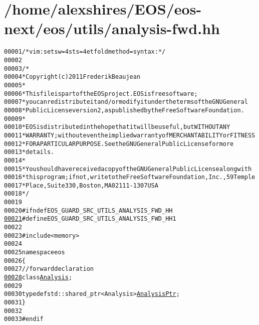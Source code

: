 \hypertarget{analysis-fwd_8hh_source}{
\section{/home/alexshires/EOS/eos-\/next/eos/utils/analysis-\/fwd.hh}
}


\begin{footnotesize}\begin{alltt}
00001 \textcolor{comment}{/* vim: set sw=4 sts=4 et foldmethod=syntax : */}
00002 
00003 \textcolor{comment}{/*}
00004 \textcolor{comment}{ * Copyright (c) 2011 Frederik Beaujean}
00005 \textcolor{comment}{ *}
00006 \textcolor{comment}{ * This file is part of the EOS project. EOS is free software;}
00007 \textcolor{comment}{ * you can redistribute it and/or modify it under the terms of the GNU General}
00008 \textcolor{comment}{ * Public License version 2, as published by the Free Software Foundation.}
00009 \textcolor{comment}{ *}
00010 \textcolor{comment}{ * EOS is distributed in the hope that it will be useful, but WITHOUT ANY}
00011 \textcolor{comment}{ * WARRANTY; without even the implied warranty of MERCHANTABILITY or FITNESS}
00012 \textcolor{comment}{ * FOR A PARTICULAR PURPOSE.  See the GNU General Public License for more}
00013 \textcolor{comment}{ * details.}
00014 \textcolor{comment}{ *}
00015 \textcolor{comment}{ * You should have received a copy of the GNU General Public License along with}
00016 \textcolor{comment}{ * this program; if not, write to the Free Software Foundation, Inc., 59 Temple}
00017 \textcolor{comment}{ * Place, Suite 330, Boston, MA  02111-1307  USA}
00018 \textcolor{comment}{ */}
00019 
00020 \textcolor{preprocessor}{#ifndef EOS\_GUARD\_SRC\_UTILS\_ANALYSIS\_FWD\_HH}
\hypertarget{analysis-fwd_8hh_source_l00021}{}\hyperlink{analysis-fwd_8hh_a897924e14cc000a079309088de1e0163}{00021} \textcolor{preprocessor}{}\textcolor{preprocessor}{#define EOS\_GUARD\_SRC\_UTILS\_ANALYSIS\_FWD\_HH 1}
00022 \textcolor{preprocessor}{}
00023 \textcolor{preprocessor}{#include <memory>}
00024 
00025 \textcolor{keyword}{namespace }eos
00026 \{
00027     \textcolor{comment}{// forward declaration}
\hypertarget{analysis-fwd_8hh_source_l00028}{}\hyperlink{namespaceeos_afc57020492535ccdd85cfc3b7421340d}{00028}     \textcolor{keyword}{class }\hyperlink{classeos_1_1Analysis}{Analysis};
00029 
00030     \textcolor{keyword}{typedef} std::shared\_ptr<Analysis> \hyperlink{namespaceeos_afc57020492535ccdd85cfc3b7421340d}{AnalysisPtr};
00031 \}
00032 
00033 \textcolor{preprocessor}{#endif}
\end{alltt}\end{footnotesize}
